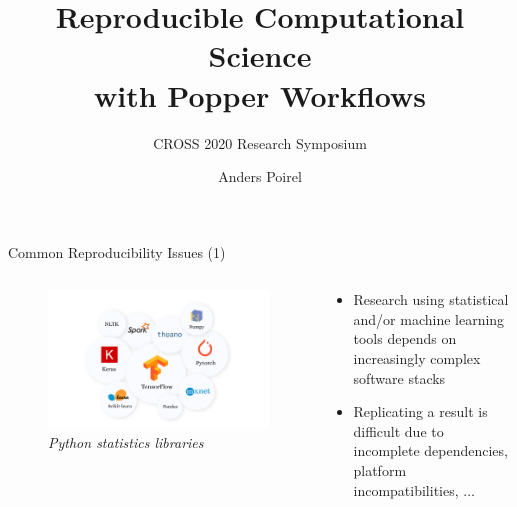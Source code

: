\documentclass[10pt]{beamer}
\title{Reproducible Computational Science\\ with Popper Workflows}
\subtitle{CROSS 2020 Research Symposium}
\author{Anders Poirel}
\date{}
\institute{ University of California, Santa Cruz}
\begin{document}
\maketitle

\begin{frame}{Common Reproducibility Issues (1)}
    \begin{columns}
        \begin{column}{0.5\textwidth}  %
            \begin{center}
                \begin{figure}
                    \includegraphics[width=1.1\textwidth]{images/libraries.png}
                    \caption*{{\sl Python statistics libraries}}
                \end{figure}
            \end{center}
        \end{column}
        \begin{column}{0.5\textwidth}
            \begin{itemize}
                \item Research using statistical and/or machine learning tools
                depends on increasingly complex software stacks
                \item Replicating a result is difficult due to 
                incomplete dependencies, platform incompatibilities, $\ldots$ 
            \end{itemize}
        \end{column}
    \end{columns}
\end{frame}
\end{document}
